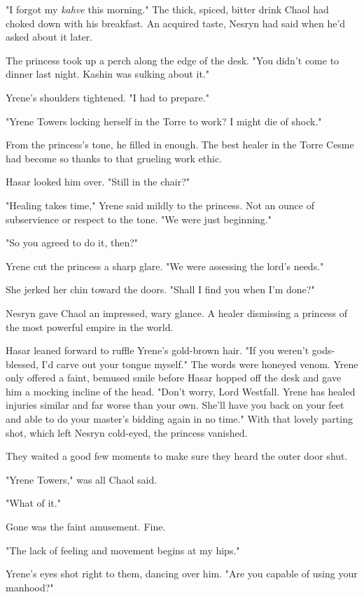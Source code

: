 "I forgot my \emph{kahve} this morning." The thick, spiced, bitter drink Chaol had choked down with his breakfast. An acquired taste, Nesryn had said when he'd asked about it later.

The princess took up a perch along the edge of the desk. "You didn't come to dinner last night. Kashin was sulking about it."

Yrene's shoulders tightened. "I had to prepare."

"Yrene Towers locking herself in the Torre to work? I might die of shock."

From the princess's tone, he filled in enough. The best healer in the Torre Cesme had become so thanks to that grueling work ethic.

Hasar looked him over. "Still in the chair?"

"Healing takes time," Yrene said mildly to the princess. Not an ounce of subservience or respect to the tone. "We were just beginning."

"So you agreed to do it, then?"

Yrene cut the princess a sharp glare. "We were assessing the lord's needs."

She jerked her chin toward the doors. "Shall I find you when I'm done?"

Nesryn gave Chaol an impressed, wary glance. A healer dismissing a princess of the most powerful empire in the world.

Hasar leaned forward to ruffle Yrene's gold-brown hair. "If you weren't gods-blessed, I'd carve out your tongue myself." The words were honeyed venom. Yrene only offered a faint, bemused smile before Hasar hopped off the desk and gave him a mocking incline of the head. "Don't worry, Lord Westfall. Yrene has healed injuries similar and far worse than your own. She'll have you back on your feet and able to do your master's bidding again in no time." With that lovely parting shot, which left Nesryn cold-eyed, the princess vanished.

They waited a good few moments to make sure they heard the outer door shut.

"Yrene Towers," was all Chaol said.

"What of it."

Gone was the faint amusement. Fine.

"The lack of feeling and movement begins at my hips."

Yrene's eyes shot right to them, dancing over him. "Are you capable of using your manhood?"

